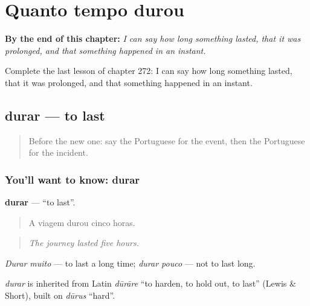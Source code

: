 
\chapter{Quanto tempo durou}
\label{ch:pt-quanto-tempo-durou}

\begin{chapteropening}
\textbf{By the end of this chapter:} \emph{I can say how long something lasted, that it was prolonged, and that something happened in an instant.}

Complete the last lesson of chapter 272: I can say how long something lasted, that it was prolonged, and that something happened in an instant.
\end{chapteropening}

\section[durar]{durar — to last}

\label{lesson:PT-C272-durar}



\begin{quote}
Before the new one: say the Portuguese for the event, then the Portuguese for the incident.
\end{quote}

\subsection*{You'll want to know: durar}
\textbf{durar} — \textquotedblleft{}to last\textquotedblright{}.

\begin{quote}
A viagem durou cinco horas.
\end{quote}

\begin{quote}
\emph{The journey lasted five hours.}
\end{quote}

\emph{Durar muito} — to last a long time; \emph{durar pouco} — not to last long.

\begin{cousinweb}
\emph{durar} is inherited from Latin \emph{dūrāre} \textquotedblleft{}to harden, to hold out, to last\textquotedblright{} (Lewis \& Short), built on \emph{dūrus} \textquotedblleft{}hard\textquotedblright{}.
\end{cousinweb}


